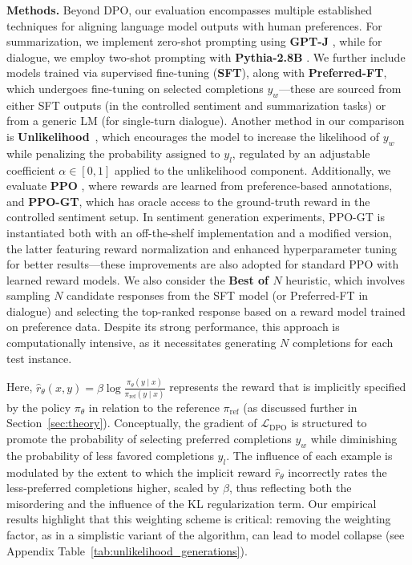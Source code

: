 \label{sec:theory}

\textbf{Methods.} Beyond DPO, our evaluation encompasses multiple established techniques for aligning language model outputs with human preferences. For summarization, we implement zero-shot prompting using \textbf{GPT-J} \citep{gpt-j}, while for dialogue, we employ two-shot prompting with \textbf{Pythia-2.8B} \citep{biderman2023pythia}. We further include models trained via supervised fine-tuning (\textbf{SFT}), along with \textbf{Preferred-FT}, which undergoes fine-tuning on selected completions $y_w$—these are sourced from either SFT outputs (in the controlled sentiment and summarization tasks) or from a generic LM (for single-turn dialogue). Another method in our comparison is \textbf{Unlikelihood}~\citep{welleck2019neural}, which encourages the model to increase the likelihood of $y_w$ while penalizing the probability assigned to $y_l$, regulated by an adjustable coefficient $\alpha \in [0,1]$ applied to the unlikelihood component. Additionally, we evaluate \textbf{PPO} \citep{schulman2017proximal}, where rewards are learned from preference-based annotations, and \textbf{PPO-GT}, which has oracle access to the ground-truth reward in the controlled sentiment setup. In sentiment generation experiments, PPO-GT is instantiated both with an off-the-shelf implementation \cite{leandro_von_werra_2023_7790115} and a modified version, the latter featuring reward normalization and enhanced hyperparameter tuning for better results—these improvements are also adopted for standard PPO with learned reward models. We also consider the \textbf{Best of $N$} heuristic, which involves sampling $N$ candidate responses from the SFT model (or Preferred-FT in dialogue) and selecting the top-ranked response based on a reward model trained on preference data. Despite its strong performance, this approach is computationally intensive, as it necessitates generating $N$ completions for each test instance.

Here, $\hat{r}_\theta(x, y) = \beta \log \frac{\pi_\theta(y \mid x)}{\pi_\text{ref}(y \mid x)}$ represents the reward that is implicitly specified by the policy $\pi_\theta$ in relation to the reference $\pi_\text{ref}$ (as discussed further in Section~\ref{sec:theory}). Conceptually, the gradient of $\mathcal{L}_\text{DPO}$ is structured to promote the probability of selecting preferred completions $y_w$ while diminishing the probability of less favored completions $y_l$. The influence of each example is modulated by the extent to which the implicit reward $\hat{r}_\theta$ incorrectly rates the less-preferred completions higher, scaled by $\beta$, thus reflecting both the misordering and the influence of the KL regularization term. Our empirical results highlight that this weighting scheme is critical: removing the weighting factor, as in a simplistic variant of the algorithm, can lead to model collapse (see Appendix Table~\ref{tab:unlikelihood_generations}).

